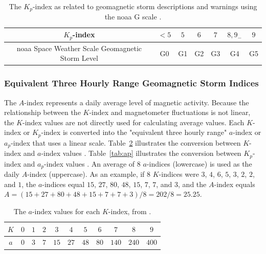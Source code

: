 \documentclass[sn-mathphys-num]{sn-jnl}%
\begin{document}
\begin{table}[!ht]
    \centering
    \caption{The $K_{p}$-index as related to geomagnetic storm descriptions and warnings using the \acrshort{noaa} G scale \cite{NOAA2024eSpace, NOAA2024fScales}.}
    \label{tab:Kp}
    \begin{tabular}{|c|c|c|c|c|c|c|}
        \hline
        $K_{p}$-index & $<5$ & $5$ & $6$ & $7$ & $8, 9_{-}$ & $9$ \\ \hline
        \acrshort{noaa} Space Weather Scale Geomagnetic Storm Level & G0 & G1 & G2 & G3 & G4 & G5 \\ \hline
    \end{tabular}
\end{table}

\subsubsection{Equivalent Three Hourly Range Geomagnetic Storm Indices}

The $A$-index \cite{NOAA2024gGeomagneticIndices} represents a daily average level of magnetic activity. Because the relationship between the $K$-index and magnetometer fluctuations is not linear, the $K$-index values are not directly used for calculating average values. Each $K$-index or $K_{p}$-index is converted into the "equivalent three hourly range" $a$-index or $a_{p}$-index that uses a linear scale. Table~\ref{tab:a} illustrates the conversion between $K$-index and $a$-index values \cite{NOAA2024bKindex}. Table~\ref{tab:ap} illustrates the conversion between $K_{p}$-index and $a_{p}$-index values \cite{NOAA2024gGeomagneticIndices}. An average of $8$ $a$-indices (lowercase) is used as the daily $A$-index (uppercase). As an example, if $8$ $K$-indices were $3$, $4$, $6$, $5$, $3$, $2$, $2$, and $1$, the $a$-indices equal $15$, $27$, $80$, $48$, $15$, $7$, $7$, and $3$, and the $A$-index equals $A = (15 + 27 + 80 + 48 + 15 + 7 + 7 + 3)/8 = 202 / 8 = 25.25$.

\begin{table}[!ht]
    \centering
    \caption{The $a$-index values for each $K$-index, from \cite{NOAA2024bKindex}.}
    \label{tab:a}
    \begin{tabular}{|c|c|c|c|c|c|c|c|c|c|c|}
        \hline
        $K$ & $0$ & $1$ & $2$ & $3$ & $4$ & $5$ & $6$ & $7$ & $8$ & $9$ \\ \hline
        $a$ & $0$ & $3$ & $7$ & $15$ & $27$ & $48$ & $80$ & $140$ & $240$ & $400$ \\ \hline
    \end{tabular}
\end{table}
\end{document}
